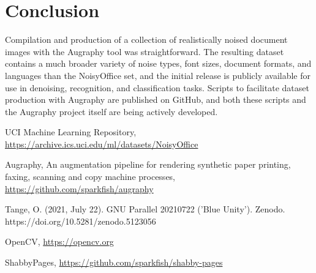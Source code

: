 \documentclass[runningheads]{llncs}
\begin{document}
\section{Conclusion}
Compilation and production of a collection of realistically noised document images with the Augraphy tool was straightforward. The resulting dataset contains a much broader variety of noise types, font sizes, document formats, and languages than the NoisyOffice set, and the initial release is publicly available for use in denoising, recognition, and classification tasks. Scripts to facilitate dataset production with Augraphy are published on GitHub, and both these scripts and the Augraphy project itself are being actively developed.



\begin{thebibliography}{5}
  UCI Machine Learning Repository, \url{https://archive.ics.uci.edu/ml/datasets/NoisyOffice}

  Augraphy, An augmentation pipeline for rendering synthetic paper printing, faxing, scanning and copy machine processes, \url{https://github.com/sparkfish/augraphy}

  Tange, O. (2021, July 22). GNU Parallel 20210722 ('Blue Unity').
  Zenodo. https://doi.org/10.5281/zenodo.5123056

  OpenCV, \url{https://opencv.org}

ShabbyPages, \url{https://github.com/sparkfish/shabby-pages}
\end{thebibliography}
\end{document}
